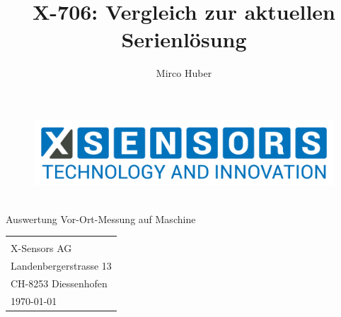 \documentclass[12pt,a4paper]{article}
\author{Mirco Huber}
\title{X-706: Vergleich zur aktuellen Serienlösung}
\newcommand{\subtitle}{Auswertung Vor-Ort-Messung auf Maschine}
\begin{document}
	\begin{titlepage}
	\begin{figure}[H]
		\centering
		\includegraphics[width=.5\linewidth]{Logos/X-SENSORS-Logo_Slogan_EN_Transparent.png}
	\end{figure}
	\vspace*{3cm}
	\begin{center}
		\Huge {\thetitle} \\\vspace*{.5cm}
		\small {\subtitle}
	\end{center}
	\vspace{12cm}
	\hspace{.6\linewidth} 
	\begin{tabular}{l}	
		\small{\theauthor} \\[.5pt]  
		\small{X-Sensors AG} \\ 
		\small{Landenbergerstrasse 13} \\
		\small{CH-8253 Diessenhofen} \\ [.5cm] 	
		\today
	\end{tabular}
\end{titlepage}
\end{document}
